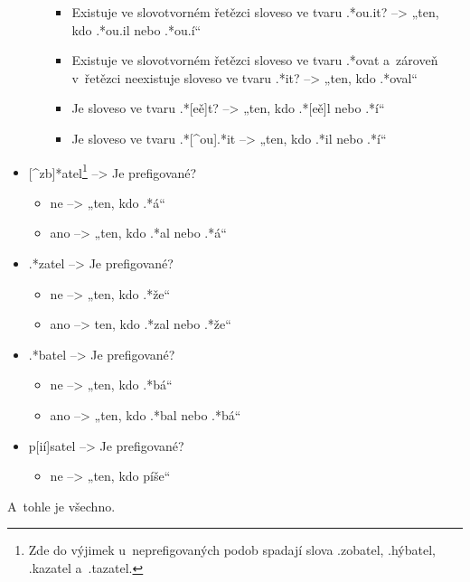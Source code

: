 \begin{itemize}
\begin{itemize}
    \begin{itemize}
    \tightlist
    \item
      Existuje ve slovotvorném řetězci sloveso ve tvaru .*ou.it?
      --\textgreater{} „ten, kdo .*ou.il nebo .*ou.í``
    \item
      Existuje ve slovotvorném řetězci sloveso ve tvaru .*ovat a~zároveň
      v~řetězci neexistuje sloveso ve tvaru .*it? --\textgreater{} „ten,
      kdo .*oval``
    \item
      Je sloveso ve tvaru .*{[}eě{]}t? --\textgreater{} „ten, kdo
      .*{[}eě{]}l nebo .*í``
    \item
      Je sloveso ve tvaru .*{[}\^{}ou{]}.*it --\textgreater{} „ten, kdo
      .*il nebo .*í``
    \end{itemize}
  \end{itemize}
\item
  {[}\^{}zb{]}*atel\footnote{Zde do výjimek u~neprefigovaných podob spadají slova .\*zobatel, .\*hýbatel, .\*kazatel a~.\*tazatel.}
  --\textgreater{} Je prefigované?

  \begin{itemize}
  \tightlist
  \item
    ne --\textgreater{} „ten, kdo .*á``
  \item
    ano --\textgreater{} „ten, kdo .*al nebo .*á``
  \end{itemize}
\item
  .*zatel --\textgreater{} Je prefigované?

  \begin{itemize}
  \tightlist
  \item
    ne --\textgreater{} „ten, kdo .*že``
  \item
    ano --\textgreater{} ten, kdo .*zal nebo .*že``
  \end{itemize}
\item
  .*batel --\textgreater{} Je prefigované?

  \begin{itemize}
  \tightlist
  \item
    ne --\textgreater{} „ten, kdo .*bá``
  \item
    ano --\textgreater{} „ten, kdo .*bal nebo .*bá``
  \end{itemize}
\item
  p{[}ií{]}satel --\textgreater{} Je prefigované?

  \begin{itemize}
  \tightlist
  \item
    ne --\textgreater{} „ten, kdo píše``
  \end{itemize}
\end{itemize}

A~tohle je všechno.
